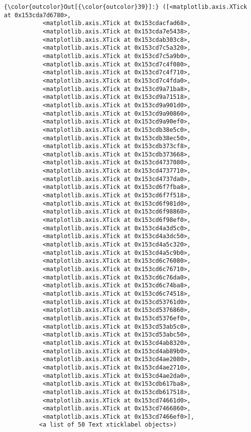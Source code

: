\documentclass[11pt]{article}
\begin{document}
\begin{Verbatim}[commandchars=\\\{\}]
{\color{outcolor}Out[{\color{outcolor}39}]:} ([<matplotlib.axis.XTick at 0x153cda7d6780>,
           <matplotlib.axis.XTick at 0x153cdacfad68>,
           <matplotlib.axis.XTick at 0x153cda7e5438>,
           <matplotlib.axis.XTick at 0x153cdab303c8>,
           <matplotlib.axis.XTick at 0x153cd7c5a320>,
           <matplotlib.axis.XTick at 0x153cd7c5a9b0>,
           <matplotlib.axis.XTick at 0x153cd7c4f080>,
           <matplotlib.axis.XTick at 0x153cd7c4f710>,
           <matplotlib.axis.XTick at 0x153cd7c4fda0>,
           <matplotlib.axis.XTick at 0x153cd9a71ba8>,
           <matplotlib.axis.XTick at 0x153cd9a71518>,
           <matplotlib.axis.XTick at 0x153cd9a901d0>,
           <matplotlib.axis.XTick at 0x153cd9a90860>,
           <matplotlib.axis.XTick at 0x153cd9a90ef0>,
           <matplotlib.axis.XTick at 0x153cdb38e5c0>,
           <matplotlib.axis.XTick at 0x153cdb38ec50>,
           <matplotlib.axis.XTick at 0x153cdb373cf8>,
           <matplotlib.axis.XTick at 0x153cdb373668>,
           <matplotlib.axis.XTick at 0x153cd4737080>,
           <matplotlib.axis.XTick at 0x153cd4737710>,
           <matplotlib.axis.XTick at 0x153cd4737da0>,
           <matplotlib.axis.XTick at 0x153cd6f7fba8>,
           <matplotlib.axis.XTick at 0x153cd6f7f518>,
           <matplotlib.axis.XTick at 0x153cd6f981d0>,
           <matplotlib.axis.XTick at 0x153cd6f98860>,
           <matplotlib.axis.XTick at 0x153cd6f98ef0>,
           <matplotlib.axis.XTick at 0x153cd4a3d5c0>,
           <matplotlib.axis.XTick at 0x153cd4a3dc50>,
           <matplotlib.axis.XTick at 0x153cd4a5c320>,
           <matplotlib.axis.XTick at 0x153cd4a5c9b0>,
           <matplotlib.axis.XTick at 0x153cd6c76080>,
           <matplotlib.axis.XTick at 0x153cd6c76710>,
           <matplotlib.axis.XTick at 0x153cd6c76da0>,
           <matplotlib.axis.XTick at 0x153cd6c74ba8>,
           <matplotlib.axis.XTick at 0x153cd6c74518>,
           <matplotlib.axis.XTick at 0x153cd53761d0>,
           <matplotlib.axis.XTick at 0x153cd5376860>,
           <matplotlib.axis.XTick at 0x153cd5376ef0>,
           <matplotlib.axis.XTick at 0x153cd53ab5c0>,
           <matplotlib.axis.XTick at 0x153cd53abc50>,
           <matplotlib.axis.XTick at 0x153cd4ab8320>,
           <matplotlib.axis.XTick at 0x153cd4ab89b0>,
           <matplotlib.axis.XTick at 0x153cd4ae2080>,
           <matplotlib.axis.XTick at 0x153cd4ae2710>,
           <matplotlib.axis.XTick at 0x153cd4ae2da0>,
           <matplotlib.axis.XTick at 0x153cdb617ba8>,
           <matplotlib.axis.XTick at 0x153cdb617518>,
           <matplotlib.axis.XTick at 0x153cd74661d0>,
           <matplotlib.axis.XTick at 0x153cd7466860>,
           <matplotlib.axis.XTick at 0x153cd7466ef0>],
          <a list of 50 Text xticklabel objects>)
\end{Verbatim}
            
\end{document}

